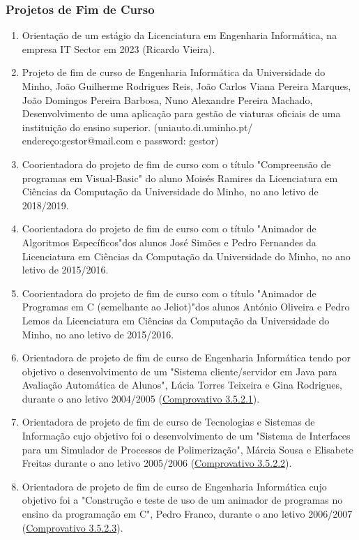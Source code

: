 \documentclass[11pt]{article}
\begin{document}
\begin{enumerate}
\end{enumerate}
\subsubsection{Projetos de Fim de Curso}
\begin{enumerate}
\item {Orientação de um estágio da Licenciatura em Engenharia Informática, na empresa IT Sector em 2023 (Ricardo Vieira).}
\item {Projeto de fim de curso de Engenharia Informática da Universidade do Minho, João Guilherme Rodrigues Reis, João Carlos Viana Pereira Marques, João Domingos Pereira Barbosa, Nuno Alexandre Pereira Machado, Desenvolvimento de uma aplicação para gestão de viaturas oficiais de uma instituição do ensino superior.
(uniauto.di.uminho.pt/ endereço:gestor@mail.com e password: gestor)}
\item {Coorientadora do projeto de fim de curso com o título "Compreensão de programas em Visual-Basic" do aluno Moisés Ramires da Licenciatura em Ciências da Computação da Universidade do Minho, no ano letivo de 2018/2019.}
\item {Coorientadora do projeto de fim de curso com o título "Animador de Algoritmos Específicos"dos alunos José Simões e Pedro Fernandes da Licenciatura em Ciências da Computação da Universidade do Minho, no ano letivo de 2015/2016.}
\item {Coorientadora do projeto de fim de curso com o título "Animador de Programas em C (semelhante ao Jeliot)"dos alunos António Oliveira e Pedro Lemos da Licenciatura em Ciências da Computação da Universidade do Minho, no ano letivo de 2015/2016.}
\item {Orientadora de projeto de fim de curso de Engenharia Informática tendo por objetivo o desenvolvimento de um "Sistema cliente/servidor em Java para Avaliação Automática de Alunos", Lúcia Torres Teixeira e Gina Rodrigues, durante o ano letivo 2004/2005 (\href{run:CoOrientTrabalhos/projFimCursoEI.pdf}{Comprovativo 3.5.2.1}).}
\item {Orientadora de projeto de fim de curso de Tecnologias e Sistemas de Informação cujo objetivo foi o desenvolvimento de um "Sistema de Interfaces para um Simulador de Processos de Polimerização", Márcia Sousa e Elisabete Freitas durante o ano letivo 2005/2006 (\href{run:CoOrientTrabalhos/projFimCursoTSI.pdf}{Comprovativo 3.5.2.2}).}
\item {Orientadora de projeto de fim de curso de Engenharia Informática cujo objetivo foi a "Construção e teste de uso de um animador de programas no ensino da programação em C", Pedro Franco, durante o ano letivo 2006/2007 (\href{run:CoOrientTrabalhos/projFimCursoEI.pdf}{Comprovativo 3.5.2.3}).}

\end{enumerate}
\end{document}
